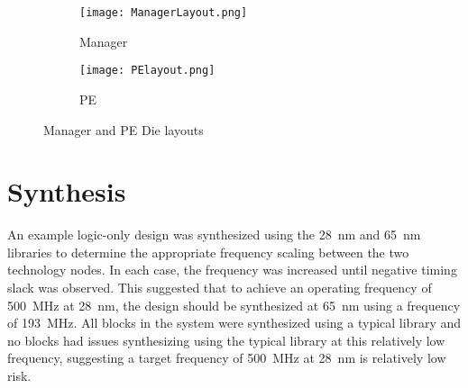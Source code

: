 \begin{figure}[h]
\centering
\begin{subfigure}{.5\textwidth}
  \centering
  \centerline{
    \mbox{\texttt{[image: ManagerLayout.png]}}
  }
  \captionsetup{justification=centering, width=.8\linewidth}
  \caption{Manager}
  \label{fig:managerLayout}
\end{subfigure}%

\bigskip

\begin{subfigure}{.5\textwidth}
  \centering
  \centerline{
    \mbox{\texttt{[image: PElayout.png]}}
  }
  \captionsetup{justification=centering, width=.8\linewidth}
  \caption{PE}
  \label{fig:peLayout}
\end{subfigure}
\captionsetup{justification=centering, width=.9\linewidth}
\caption{Manager and PE Die layouts}
\label{fig:Manager and PE Die layouts}
\end{figure}



\section{Synthesis}
\label{sec:Synthesis}

An example logic-only design was synthesized using the \SI{28}{\nano\meter} and \SI{65}{\nano\meter} libraries to determine the appropriate frequency scaling between the two technology nodes.
In each case, the frequency was increased until negative timing slack was observed.
This suggested that to achieve an operating frequency of \SI{500}{\mega\hertz} at \SI{28}{\nano\meter}, the design should be synthesized at \SI{65}{\nano\meter} using a frequency of \SI{193}{\mega\hertz}.
All blocks in the system were synthesized using a typical library and no blocks had issues synthesizing using the typical library at this relatively low frequency, suggesting a target frequency of \SI{500}{\mega\hertz} at \SI{28}{\nano\meter} is relatively low risk.


\iffalse
As mentioned previously \eqref{eq:averageBandwidth}, to process multiple useful-sized \acp{ann} requires a sustained bandwidth to the \ac{pe} of the order of tens of \SI[per-mode=symbol]{}{\tera\bit\per\second}.
\fi

